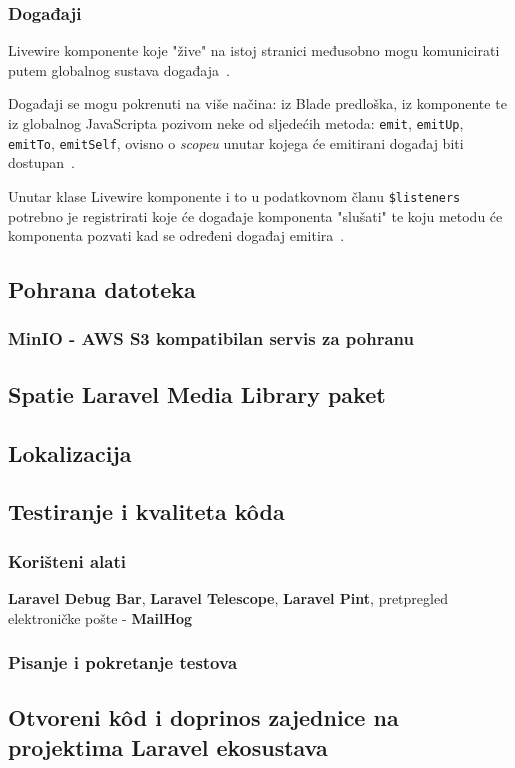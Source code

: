 \subsubsection{Događaji}
Livewire komponente koje "žive" na istoj stranici međusobno mogu komunicirati putem globalnog sustava događaja~\cite{livewireEvents}.

Događaji se mogu pokrenuti na više načina: iz Blade predloška, iz komponente te iz globalnog JavaScripta pozivom neke od sljedećih metoda: \texttt{emit}, \texttt{emitUp}, \texttt{emitTo}, \texttt{emitSelf}, ovisno o \textit{scopeu} unutar kojega će emitirani događaj biti dostupan~\cite{livewireEvents}.

Unutar klase Livewire komponente i to u podatkovnom članu \texttt{\$listeners} potrebno je registrirati koje će događaje komponenta "slušati" te koju metodu će komponenta pozvati kad se određeni događaj emitira~\cite{livewireEvents}. 

\subsection{Pohrana datoteka}

\subsubsection{MinIO - AWS S3 kompatibilan servis za pohranu}

\subsection{Spatie Laravel Media Library paket}

\subsection{Lokalizacija}
\label{subsection:localization}

\subsection{Testiranje i kvaliteta k\^oda}

\subsubsection{Korišteni alati}
\textbf{Laravel Debug Bar}, \textbf{Laravel Telescope}, \textbf{Laravel Pint}, pretpregled elektroničke pošte - \textbf{MailHog}

\subsubsection{Pisanje i pokretanje testova}

\subsection{Otvoreni k\^od i doprinos zajednice na projektima Laravel ekosustava}

